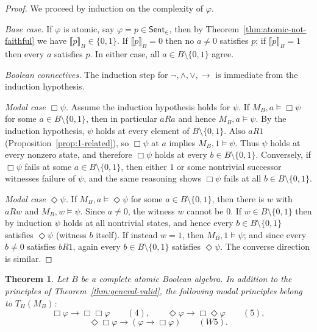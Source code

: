 \documentclass[11pt]{amsart}
\theoremstyle{definition}
\theoremstyle{plain}
\newtheorem{theorem}[definition]{Theorem}
\newcommand{\Sent}{\mathsf{Sent}}
\newcommand{\val}[1]{\llbracket #1\rrbracket_B}
\begin{document}
\begin{proof}
We proceed by induction on the complexity of $\varphi$.

\smallskip\noindent\emph{Base case.}
If $\varphi$ is atomic, say $\varphi=p\in\Sent_{\in}$, then by Theorem~\ref{thm:atomic-not-faithful} we have
$\val{p}\in\{0,1\}$. If $\val{p}=0$ then no $a\ne 0$ satisfies $p$; if $\val{p}=1$ then every $a$ satisfies $p$.
In either case, all $a\in B\setminus\{0,1\}$ agree.

\smallskip\noindent\emph{Boolean connectives.}
The induction step for $\neg,\wedge,\vee,\to$ is immediate from the induction hypothesis.

\smallskip\noindent\emph{Modal case $\Box\psi$.}
Assume the induction hypothesis holds for $\psi$.
If $M_B,a\models \Box\psi$ for some $a\in B\setminus\{0,1\}$, then in particular $aRa$ and hence $M_B,a\models\psi$.
By the induction hypothesis, $\psi$ holds at every element of $B\setminus\{0,1\}$.
Also $aR1$ (Proposition~\ref{prop:1-related}), so $\Box\psi$ at $a$ implies $M_B,1\models\psi$.
Thus $\psi$ holds at every nonzero state, and therefore $\Box\psi$ holds at every $b\in B\setminus\{0,1\}$.
Conversely, if $\Box\psi$ fails at some $a\in B\setminus\{0,1\}$, then either $1$ or some nontrivial successor
witnesses failure of $\psi$, and the same reasoning shows $\Box\psi$ fails at all $b\in B\setminus\{0,1\}$.

\smallskip\noindent\emph{Modal case $\Diamond\psi$.}
If $M_B,a\models\Diamond\psi$ for some $a\in B\setminus\{0,1\}$, then there is $w$ with $aRw$ and $M_B,w\models\psi$.
Since $a\neq 0$, the witness $w$ cannot be $0$.
If $w\in B\setminus\{0,1\}$ then by induction $\psi$ holds at all nontrivial states, and hence every
$b\in B\setminus\{0,1\}$ satisfies $\Diamond\psi$ (witness $b$ itself).
If instead $w=1$, then $M_B,1\models\psi$; and since every $b\ne 0$ satisfies $bR1$, again every
$b\in B\setminus\{0,1\}$ satisfies $\Diamond\psi$.
The converse direction is similar.
\end{proof}

\begin{theorem}\label{thm:atomic-validities}
Let $B$ be a complete atomic Boolean algebra. In addition to the principles of
Theorem~\ref{thm:general-valid}, the following modal principles belong to $T_H(M_B)$:
\[
\Box\varphi \to \Box\Box\varphi\qquad (4),
\qquad
\Diamond\varphi \to \Box\Diamond\varphi\qquad (5),
\]
\[
\Diamond\Box\varphi \to (\varphi\to \Box\varphi)\qquad (W5).
\]
\end{theorem}
\end{document}
